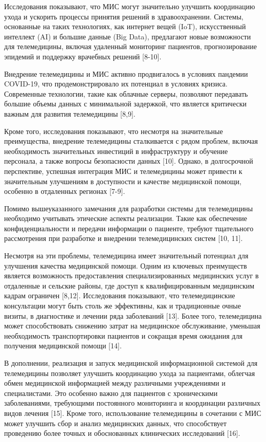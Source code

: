 Исследования показывают, что МИС могут значительно улучшить координацию
ухода и ускорить процессы принятия решений в здравоохранении. Системы,
основанные на таких технологиях, как интернет вещей (IoT), искусственный
интеллект (AI) и большие данные (Big Data), предлагают новые возможности
для телемедицины, включая удаленный мониторинг пациентов,
прогнозирование эпидемий и поддержку врачебных решений {[}8-10{]}.

Внедрение телемедицины и МИС активно продвигалось в условиях пандемии
COVID-19, что продемонстрировало их потенциал в условиях кризиса.
Современные технологии, такие как облачные серверы, позволяют передавать
большие объемы данных с минимальной задержкой, что является критически
важным для развития телемедицины {[}8,9{]}.

Кроме того, исследования показывают, что несмотря на значительные
преимущества, внедрение телемедицины сталкивается с рядом проблем,
включая необходимость значительных инвестиций в инфраструктуру и
обучение персонала, а также вопросы безопасности данных {[}10{]}.
Однако, в долгосрочной перспективе, успешная интеграция МИС и
телемедицины может привести к значительным улучшениям в доступности и
качестве медицинской помощи, особенно в отдаленных регионах {[}7-9{]}.

Помимо вышеуказанного замечания для разработки системы для телемедицины
необходимо учитывать этические аспекты реализации. Такие как обеспечение
конфиденциальности и передачи информации о пациенте, требуют тщательного
рассмотрения при разработке и внедрении телемедицинских систем {[}10,
11{]}.

Несмотря на эти проблемы, телемедицина имеет значительный потенциал для
улучшения качества медицинской помощи. Одним из ключевых преимуществ
является возможность предоставления специализированных медицинских услуг
в отдаленные и сельские районы, где доступ к квалифицированным
медицинским кадрам ограничен {[}8,12{]}. Исследования показывают, что
телемедицинские консультации могут быть столь же эффективны, как и
традиционные очные визиты, в диагностике и лечении ряда заболеваний
{[}13{]}. Более того, телемедицина может способствовать снижению затрат
на медицинское обслуживание, уменьшая необходимость транспортировки
пациентов и сокращая время ожидания для получения медицинской помощи
{[}14{]}.

В дополнении, реализация и запуск медицинской информационной системой
для телемедицины позволяет улучшить координацию ухода за пациентами,
облегчая обмен медицинской информацией между различными учреждениями и
специалистами. Это особенно важно для пациентов с хроническими
заболеваниями, требующими постоянного мониторинга и координации
различных видов лечения {[}15{]}. Кроме того, использование телемедицины
в сочетании с МИС может улучшить сбор и анализ медицинских данных, что
способствует проведению более точных и обоснованных клинических
исследований {[}16{]}.

